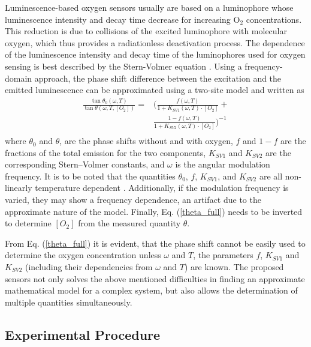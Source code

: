 \documentclass[sensors,article,submit,moreauthors,pdftex,10pt,a4paper]{Definitions/mdpi}
\begin{document}
Luminescence-based oxygen sensors usually are based on a luminophore whose luminescence intensity and decay time decrease for increasing O$_2$ concentrations. This reduction is due to collisions of the excited luminophore with molecular oxygen, which thus provides a radiationless deactivation process. The dependence of the luminescence intensity and decay time of the luminophores used for oxygen sensing is best described by the Stern-Volmer equation \cite{Lakowicz2006}. Using a frequency-domain approach, the phase shift difference between the excitation and the emitted luminescence can be approximated using a two-site model \cite{Carraway1991,Demas1995} and written as \cite{Michelucci2019}
\begin{equation}
\begin{aligned}
\frac{\tan \theta_0 (\omega, T)}{\tan \theta (\omega, T, [O_2])}=
 & \bigg( \frac{f (\omega , T) }{1+K_{SV1} (\omega , T) \cdot \left[O_2\right]}+ \\
&\frac{1-f (\omega , T) }{1+K_{SV2} (\omega , T) \cdot \left[O_2\right]} \bigg)^{-1} \\
\label{theta_full}
\end{aligned}
\end{equation}
where $\theta_0$ and $\theta$, are the phase shifts without and with oxygen, $f$ and $1-f$ are the fractions of the total emission for the two components, $K_{SV1}$ and $K_{SV2}$ are the corresponding Stern–Volmer constants, and $\omega$ is the angular modulation frequency. It is to be noted that the quantities $\theta_0$, $f$, $K_{SV1}$, and $K_{SV2}$ are all non-linearly temperature dependent \cite{Ogurtsov2006,lo2008,Zaitsev2016}. Additionally, if the modulation frequency is varied, they may show a frequency dependence, an artifact due to the approximate nature of the model. Finally, Eq. (\ref{theta_full}) needs to be inverted to determine $[O_2]$ from the measured quantity $\theta$.

From Eq. (\ref{theta_full}) it is evident, that the phase shift cannot be easily used to determine the oxygen concentration unless $\omega$ and $T$, the parameters $f$, $K_{SV1}$ and $K_{SV2}$ (including their dependencies from $\omega$ and $T$) are known.
The proposed sensors not only solves the above mentioned difficulties in finding an approximate mathematical model for a complex system, but also allows the determination of multiple quantities simultaneously.

\subsection{Experimental Procedure}
\label{Experimental}
\end{document}
